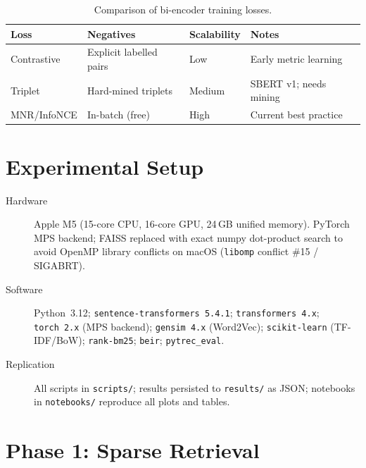\documentclass[12pt, a4paper]{article}
\begin{document}
\begin{table}[h]
\centering
\caption{Comparison of bi-encoder training losses.}
\label{tab:losses}
\begin{tabular}{llll}
\toprule
\textbf{Loss} & \textbf{Negatives} & \textbf{Scalability} & \textbf{Notes} \\
\midrule
Contrastive & Explicit labelled pairs & Low    & Early metric learning \\
Triplet     & Hard-mined triplets      & Medium & SBERT v1; needs mining \\
MNR/InfoNCE & In-batch (free)          & High   & Current best practice \\
\bottomrule
\end{tabular}
\end{table}

\section{Experimental Setup}
\label{sec:setup}

\begin{description}
  \item[Hardware]  Apple M5 (15-core CPU, 16-core GPU, 24\,GB unified memory).
        PyTorch MPS backend; FAISS replaced with exact numpy dot-product search
        to avoid OpenMP library conflicts on macOS (\texttt{libomp} conflict
        \#15 / SIGABRT).
  \item[Software]  Python~3.12; \texttt{sentence-transformers~5.4.1};
        \texttt{transformers~4.x}; \texttt{torch~2.x} (MPS backend);
        \texttt{gensim~4.x} (Word2Vec); \texttt{scikit-learn} (TF-IDF/BoW);
        \texttt{rank-bm25}; \texttt{beir}; \texttt{pytrec\_eval}.
  \item[Replication]  All scripts in \texttt{scripts/}; results persisted to
        \texttt{results/} as JSON; notebooks in \texttt{notebooks/} reproduce
        all plots and tables.
\end{description}

\section{Phase 1: Sparse Retrieval}
\label{sec:sparse}
\end{document}
